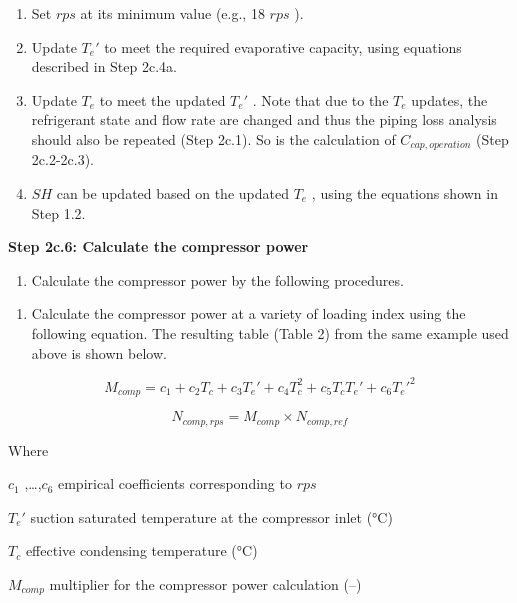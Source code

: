 \begin{enumerate}
\def\labelenumi{\alph{enumi}.}
\item
  Set \(rps\) at its minimum value (e.g., 18 \(rps\) ).
\item
  Update \({T_e}'\) to meet the required evaporative capacity, using equations described in Step 2c.4a.
\item
  Update \(T_e\) to meet the updated \({T_e}'\) . Note that due to the \(T_e\) updates, the refrigerant state and flow rate are changed and thus the piping loss analysis should also be repeated (Step 2c.1). So is the calculation of \(C_{cap,operation}\) (Step 2c.2-2c.3).
\item
  \(SH\) can be updated based on the updated \(T_e\) , using the equations shown in Step 1.2.
\end{enumerate}

\textbf{Step 2c.6: Calculate the compressor power} 

\begin{enumerate}
\def\labelenumi{(\arabic{enumi})}
\tightlist
\item
  Calculate the compressor power by the following procedures. 
\end{enumerate}

\begin{enumerate}
\def\labelenumi{\alph{enumi}.}
\tightlist
\item
  Calculate the compressor power at a variety of loading index using the following equation. The resulting table (Table 2) from the same example used above is shown below.
\end{enumerate}

\begin{equation}
  M_{comp} = c_1+c_2T_c+c_3{T_e}'+c_4T_c^2+c_5T_c{T_e}'+c_6{T_e}'^2
\end{equation}

\begin{equation}
  N_{comp,rps} = M_{comp} \times N_{comp,ref}
\end{equation}

Where

\(c_1\) ,\ldots{},\(c_6\) empirical coefficients corresponding to \(rps\)

\({T_e}'\) suction saturated temperature at the compressor inlet (°C)

\(T_c\) effective condensing temperature (°C)

\(M_{comp}\) multiplier for the compressor power calculation (--)

